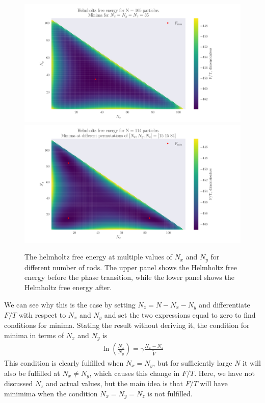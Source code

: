 \documentclass[reprint,english,notitlepage,aps,nobalancelastpage,nofootinbib]{revtex4-1}
\newcommand{\closed}[1]{\left(#1\right)}
\newcommand{\nx}{N_x}
\newcommand{\ny}{N_y}
\newcommand{\nz}{N_z}
\newcommand{\V}{\tilde{V}}
\begin{document}
  

\begin{figure}[h!]
	\centering
	\includegraphics[width=0.9\linewidth]{helmholtz_n105_contour.pdf}
	\includegraphics[width=0.9\linewidth]{helmholtz_n114_contour.pdf}
	\caption{The helmholtz free energy at multiple values of $\nx$ and $\ny$ for different number of rods. The upper panel shows the Helmholtz free energy before the phase transition, while the lower panel shows the Helmholtz free energy after.}
	\label{fig:F_contour}
\end{figure}

We can see why this is the case by setting $\nz=N-\nx-\ny$ and differentiate $F/T$ with respect to $\nx$ and $\ny$ and set the two expressions equal to zero to find conditions for minima. Stating the result without deriving it, the condition for minima in terms of $\nx$ and $\ny$ is 
\begin{align*}
	\ln\closed{\frac{\nx}{\ny}}=\gamma \frac{\nx - \nz}{\V}
\end{align*}
This condition is clearly fulfilled when $\nx=\ny$, but for sufficiently large $N$ it will also be fulfilled at $\nx\neq\ny$, which causes this change in $F/T$. Here, we have not discussed $\nz$ and actual values, but the main idea is that $F/T$ will have minimima when the condition $\nx=\ny=\nz$ is not fulfilled. 
\end{document}
